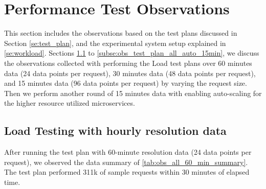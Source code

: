 \section{Performance Test Observations}
\label{se:observations}

This section includes the observations based on the test plans discussed in Section \cref{se:test_plan}, and the experimental system setup explained in \cref{se:workload}. Sections \ref{subse:obs_test_plan_all_60min} to \ref{subse:obs_test_plan_all_auto_15min}, we discuss the observations collected with performing the Load test plans over 60 minutes data (24 data points per request), 30 minutes data (48 data points per request), and 15 minutes data (96 data points per request) by varying the request size. Then we perform another round of 15 minutes data with enabling auto-scaling for the higher resource utilized microservices.

\subsection{Load Testing with hourly resolution data}
\label{subse:obs_test_plan_all_60min}

After running the test plan with 60-minute resolution data (24 data points per request), we observed the data summary of \cref{tab:obs_all_60_min_summary}. The test plan performed 311k of sample requests within 30 minutes of elapsed time.

